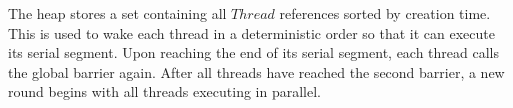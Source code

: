 The heap stores a set containing all $Thread$ references sorted by
creation time.  This is used to wake each thread in a deterministic
order so that it can execute its serial segment.  Upon reaching the
end of its serial segment, each thread calls the global barrier again.
After all threads have reached the second barrier, a new round begins
with all threads executing in parallel.
